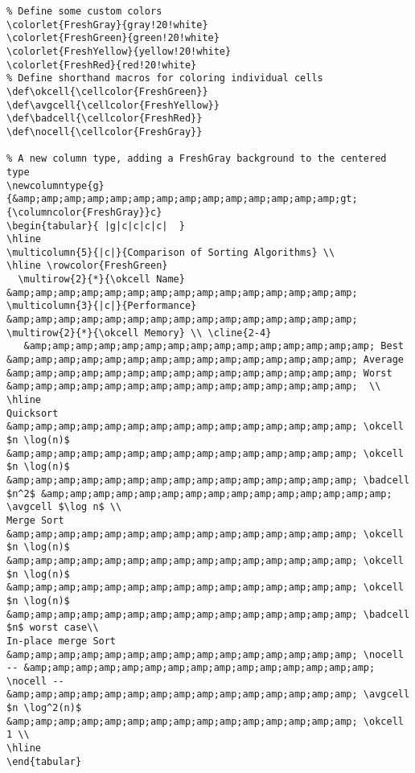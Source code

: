 \begin{lstlisting}
% Define some custom colors
\colorlet{FreshGray}{gray!20!white}
\colorlet{FreshGreen}{green!20!white}
\colorlet{FreshYellow}{yellow!20!white}
\colorlet{FreshRed}{red!20!white}
% Define shorthand macros for coloring individual cells
\def\okcell{\cellcolor{FreshGreen}}
\def\avgcell{\cellcolor{FreshYellow}}
\def\badcell{\cellcolor{FreshRed}}
\def\nocell{\cellcolor{FreshGray}}

% A new column type, adding a FreshGray background to the centered type
\newcolumntype{g}{&amp;amp;amp;amp;amp;amp;amp;amp;amp;amp;amp;amp;amp;amp;gt;{\columncolor{FreshGray}}c}
\begin{tabular}{ |g|c|c|c|c|  }
\hline
\multicolumn{5}{|c|}{Comparison of Sorting Algorithms} \\
\hline \rowcolor{FreshGreen} 
  \multirow{2}{*}{\okcell Name} &amp;amp;amp;amp;amp;amp;amp;amp;amp;amp;amp;amp;amp;amp;amp; \multicolumn{3}{|c|}{Performance} &amp;amp;amp;amp;amp;amp;amp;amp;amp;amp;amp;amp;amp;amp;amp; \multirow{2}{*}{\okcell Memory} \\ \cline{2-4}
   &amp;amp;amp;amp;amp;amp;amp;amp;amp;amp;amp;amp;amp;amp;amp; Best &amp;amp;amp;amp;amp;amp;amp;amp;amp;amp;amp;amp;amp;amp;amp; Average &amp;amp;amp;amp;amp;amp;amp;amp;amp;amp;amp;amp;amp;amp;amp; Worst &amp;amp;amp;amp;amp;amp;amp;amp;amp;amp;amp;amp;amp;amp;amp;  \\
\hline
Quicksort &amp;amp;amp;amp;amp;amp;amp;amp;amp;amp;amp;amp;amp;amp;amp; \okcell $n \log(n)$ &amp;amp;amp;amp;amp;amp;amp;amp;amp;amp;amp;amp;amp;amp;amp; \okcell $n \log(n)$ &amp;amp;amp;amp;amp;amp;amp;amp;amp;amp;amp;amp;amp;amp;amp; \badcell $n^2$ &amp;amp;amp;amp;amp;amp;amp;amp;amp;amp;amp;amp;amp;amp;amp; \avgcell $\log n$ \\
Merge Sort &amp;amp;amp;amp;amp;amp;amp;amp;amp;amp;amp;amp;amp;amp;amp; \okcell $n \log(n)$ &amp;amp;amp;amp;amp;amp;amp;amp;amp;amp;amp;amp;amp;amp;amp; \okcell $n \log(n)$ &amp;amp;amp;amp;amp;amp;amp;amp;amp;amp;amp;amp;amp;amp;amp; \okcell $n \log(n)$ &amp;amp;amp;amp;amp;amp;amp;amp;amp;amp;amp;amp;amp;amp;amp; \badcell $n$ worst case\\
In-place merge Sort &amp;amp;amp;amp;amp;amp;amp;amp;amp;amp;amp;amp;amp;amp;amp; \nocell -- &amp;amp;amp;amp;amp;amp;amp;amp;amp;amp;amp;amp;amp;amp;amp; \nocell -- &amp;amp;amp;amp;amp;amp;amp;amp;amp;amp;amp;amp;amp;amp;amp; \avgcell $n \log^2(n)$ &amp;amp;amp;amp;amp;amp;amp;amp;amp;amp;amp;amp;amp;amp;amp; \okcell 1 \\
\hline
\end{tabular}
\end{lstlisting}

